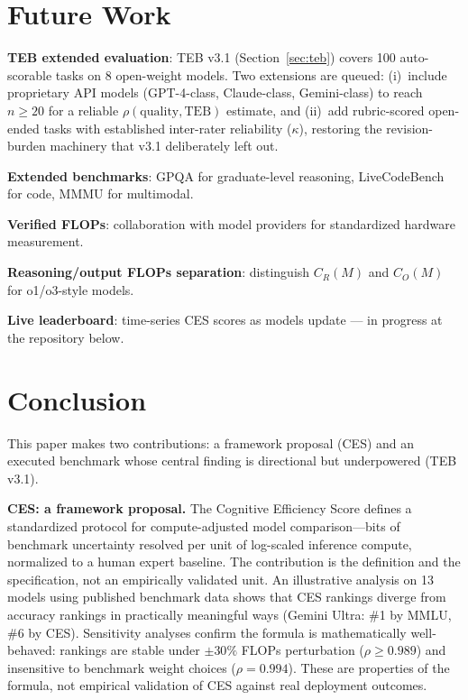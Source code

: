 \documentclass[12pt]{article}
\begin{document}
\section{Future Work}
\label{sec:future}

\textbf{TEB extended evaluation}: TEB v3.1 (Section~\ref{sec:teb}) covers 100 auto-scorable tasks on 8 open-weight models. Two extensions are queued: (i)~include proprietary API models (GPT-4-class, Claude-class, Gemini-class) to reach $n \geq 20$ for a reliable $\rho(\mathrm{quality}, \mathrm{TEB})$ estimate, and (ii)~add rubric-scored open-ended tasks with established inter-rater reliability ($\kappa$), restoring the revision-burden machinery that v3.1 deliberately left out.

\textbf{Extended benchmarks}: GPQA \cite{rein2023} for graduate-level reasoning, LiveCodeBench \cite{jain2024} for code, MMMU \cite{yue2024} for multimodal.

\textbf{Verified FLOPs}: collaboration with model providers for standardized hardware measurement.

\textbf{Reasoning/output FLOPs separation}: distinguish $C_R(M)$ and $C_O(M)$ for o1/o3-style models.

\textbf{Live leaderboard}: time-series CES scores as models update --- in progress at the repository below.

\section{Conclusion}

This paper makes two contributions: a framework proposal (CES) and an executed benchmark whose central finding is directional but underpowered (TEB v3.1).

\textbf{CES: a framework proposal.} The Cognitive Efficiency Score defines a standardized protocol for compute-adjusted model comparison---bits of benchmark uncertainty resolved per unit of log-scaled inference compute, normalized to a human expert baseline. The contribution is the definition and the specification, not an empirically validated unit. An illustrative analysis on 13 models using published benchmark data shows that CES rankings diverge from accuracy rankings in practically meaningful ways (Gemini Ultra: \#1 by MMLU, \#6 by CES). Sensitivity analyses confirm the formula is mathematically well-behaved: rankings are stable under $\pm30\%$ FLOPs perturbation ($\rho \geq 0.989$) and insensitive to benchmark weight choices ($\rho = 0.994$). These are properties of the formula, not empirical validation of CES against real deployment outcomes.
\end{document}
